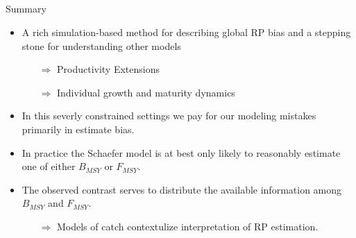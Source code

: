 \documentclass[ xcolor = pdftex, dvipsnames, table ]{beamer}
\begin{document}
\subsection{}
%
\begin{frame}{Summary}
\linespread{1.25}
%
$~$\\
\vspace*{-1.5cm}
\hspace*{-1cm}
\begin{itemize}	
	\item A rich simulation-based method for describing global RP bias and a stepping stone for understanding other models	
	\begin{itemize}
                \item[$\Rightarrow$] Productivity Extensions
                \item[$\Rightarrow$] Individual growth and maturity dynamics
        \end{itemize}
	\item In this severly constrained settings we pay for our modeling mistakes primarily in estimate bias.
	\item In practice the Schaefer model is at best only likely to reasonably estimate one of either $B_{MSY}$ or $F_{MSY}$.
	\item The observed contrast serves to distribute the available information among $B_{MSY}$ and $F_{MSY}$. 
	\begin{itemize}
		\item[$\Rightarrow$] Models of catch contextulize interpretation of RP estimation.
	\end{itemize}
\end{itemize}
\end{frame}
\end{document}
